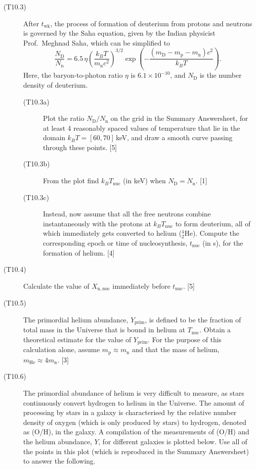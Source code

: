 \begin{description}
\item[(T10.3)] After $t_{\mathrm{wk}}$, the process of formation of deuterium
  from protons and neutrons is governed by the Saha equation, given by the
  Indian physicist Prof.\ Meghnad Saha, which can be simplified to
  \[ \frac{N_{\mathrm{D}}}{N_{\mathrm{n}}}
     = 6.5\,\eta\left(\frac{k_B T}{m_{\mathrm{n}}c^2}\right)^{3/2}
       \exp\left(-\frac{(m_{\mathrm{D}} - m_{\mathrm{p}}
       - m_{\mathrm{n}})c^2}{k_B T}\right). \]
  Here, the baryon-to-photon ratio $\eta$ is $6.1 \times 10^{-10}$, and
  $N_{\mathrm{D}}$ is the number density of deuterium.
  \begin{description}
  \item[(T10.3a)] Plot the ratio $N_{\mathrm{D}}/N_{\mathrm{n}}$ on the grid
    in the Summary Answersheet, for at least 4 reasonably spaced values of
    temperature that lie in the domain $k_B T = [60, 70]$\,keV, and draw a
    smooth curve passing through these points. \hfill[5]
  \item[(T10.3b)] From the plot find $k_B T_{\mathrm{nuc}}$ (in keV) when
    $N_{\mathrm{D}} = N_{\mathrm{n}}$. \hfill[1]
  \item[(T10.3c)] Instead, now assume that all the free neutrons combine
    instantaneously with the protons at $k_B T_{\mathrm{nuc}}$ to form
    deuterium, all of which immediately gets converted to helium
    ($^4_2$He). Compute the corresponding epoch or time of nucleosynthesis,
    $t_{\mathrm{nuc}}$ (in s), for the formation of helium. \hfill[4]
  \end{description}
\item[(T10.4)] Calculate the value of $X_{\mathrm{n,nuc}}$ immediately before
  $t_{\mathrm{nuc}}$. \hfill[5]
\item[(T10.5)] The primordial helium abundance, $Y_{\mathrm{prim}}$, is
  defined to be the fraction of total mass in the Universe that is bound in
  helium at $T_{\mathrm{nuc}}$. Obtain a theoretical estimate for the value of
  $Y_{\mathrm{prim}}$. For the purpose of this calculation alone, assume
  $m_{\mathrm{p}} \approx m_{\mathrm{n}}$ and that the mass of helium,
  $m_{\mathrm{He}} \approx 4m_{\mathrm{n}}$. \hfill[3]
\item[(T10.6)] The primordial abundance of helium is very difficult to
  measure, as stars continuously convert hydrogen to helium in the Universe.
  The amount of processing by stars in a galaxy is characterised by the
  relative number density of oxygen (which is only produced by stars) to
  hydrogen, denoted as (O/H), in the galaxy. A compilation of the measurements
  of (O/H) and the helium abundance, $Y$, for different galaxies is plotted
  below. Use all of the points in this plot (which is reproduced in the
  Summary Answersheet) to answer the following.


\end{description}

